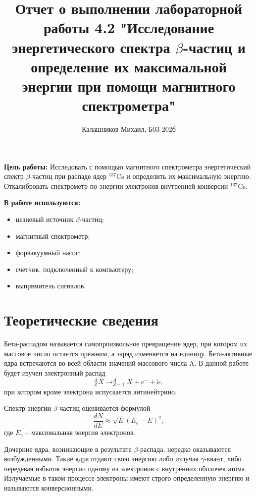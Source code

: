 \documentclass[14pt, a4paper]{report}
\title{\textbf{Отчет о выполнении лабораторной работы 4.2 "Исследование энергетического спектра $\beta$-частиц и определение их максимальной энергии при помощи магнитного спектрометра"}}
\author{Калашников Михаил, Б03-202б}
\date{}
\begin{document}
\maketitle

\textbf{Цель работы:}
Исследовать с помощью магнитного спектрометра энергетический спектр $\beta$-частиц при распаде ядер $^{137}$Cs и определить их максимальную энергию. Откалибровать спектрометр по энергии электронов внутренней конверсии $^{137}$Cs.
\newline

\textbf{В работе используются:}
\begin{itemize}
\item цезиевый источник $\beta$-частиц;
\item магнитный спектрометр;
\item форвакуумный насос;
\item счетчик, подключенный к компьютеру;
\item выпрямитель сигналов.
\end{itemize}

\section{Теоретические сведения}

Бета-распадом называется самопроизвольное превращение ядер, при котором их массовое число остается прежним, а заряд изменяется на единицу. Бета-активные ядра встречаются во всей области значений массового числа A.
В данной работе будет изучен электронный распад
\[^A_Z X \rightarrow _{Z+1}^A X+e^-+\tilde{\nu},\]
при котором кроме электрона испускается антинейтрино.

Спектр энергии $\beta$-частиц оценивается формулой
\[\frac{dN}{dE}\approx\sqrt{E}(E_e-E)^2,\]
где $E_e$ -- максимальная энергия электронов.

Дочерние ядра, возникающие в результате $\beta$-распада, нередко оказываются возбужденными. Такие ядра отдают свою энергию либо излучая $\gamma$-квант, либо передевая избыток энергии одному из электронов с внутренних оболочек атома. Излучаемые в таком процессе электроны имеют строго определенную энергию и называются конверсионными.
\end{document}
